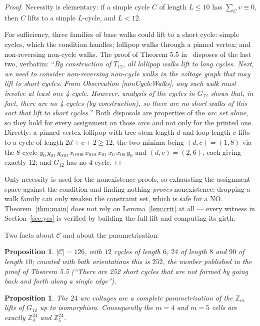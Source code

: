 \documentclass[11pt]{amsart}
\newtheorem{proposition}[theorem]{Proposition}
\theoremstyle{remark}
\newcommand{\Zm}{\mathbb{Z}_m}
\newcommand{\Gt}{G_{12}}
\newcommand{\Tt}{T_{12}}
\begin{document}
\begin{proof}
Necessity is elementary: if a simple cycle $C$ of length $L \le 10$ has
$\sum_C v \equiv 0$, then $C$ lifts to a simple $L$-cycle, and $L < 12$.

For sufficiency, three families of base walks could lift to a short cycle:
simple cycles, which the condition handles; lollipop walks through a pinned
vertex; and non-reversing non-cycle walks. The proof of Theorem 5.5
in~\cite[p.~25]{AAB} disposes of the last two, verbatim: ``\emph{By
construction of $\Tt$, all lollipop walks lift to long cycles. Next, we need to
consider non-reversing non-cycle walks in the voltage graph that may lift to
short cycles. From Observation \textup{[nonCycleWalks]}, any such walk must
involve at least one 4-cycle. However, analysis of the cycles in $\Gt$ shows
that, in fact, there are no 4-cycles (by construction), so there are no short
walks of this sort that lift to short cycles.}'' Both disposals are properties
of the \emph{arc set alone}, so they hold for every assignment on those arcs and
not only for the printed one. Directly: a pinned-vertex lollipop with tree-stem length $d$ and loop length $c$ lifts to a
cycle of length $2d + c + 2 \ge 12$, the two minima being $(d,c) = (1,8)$ via
the $8$-cycle
$y_0\,y_{01}\,y_{010}\,x_{0100}\,x_{010}\,x_{01}\,x_0\,x_{00}\,y_0$ and
$(d,c) = (2,6)$, each giving exactly $12$; and $\Gt$ has no $4$-cycle.
\end{proof}

Only necessity is used for the nonexistence proofs, so exhausting the assignment
space against the condition and finding nothing \emph{proves} nonexistence:
dropping a walk family can only weaken the constraint set, which is safe for a
NO. Theorem~\ref{thm:main} does not rely on Lemma~\ref{lem:crit} at all --- every
witness in Section~\ref{sec:yes} is verified by building the full lift and
computing its girth.

Two facts about $\mathcal{C}$ and about the parametrisation:

\begin{proposition}\label{prop:census}
$|\mathcal{C}| = 126$, with $12$ cycles of length $6$, $24$ of length $8$ and
$90$ of length $10$; counted with both orientations this is $252$, the number
published in the proof of Theorem 5.5 \textup{(}``\emph{There are 252 short
cycles that are not formed by going back and forth along a single
edge}''\textup{)}.
\end{proposition}

\begin{proposition}\label{prop:gauge}
The $24$ arc voltages are a complete parametrisation of the $\Zm$ lifts of
$\Gt$ up to isomorphism. Consequently the $m = 4$ and $m = 5$ cells are exactly
$\mathbb{Z}_4^{24}$ and $\mathbb{Z}_5^{24}$.
\end{proposition}
\end{document}
